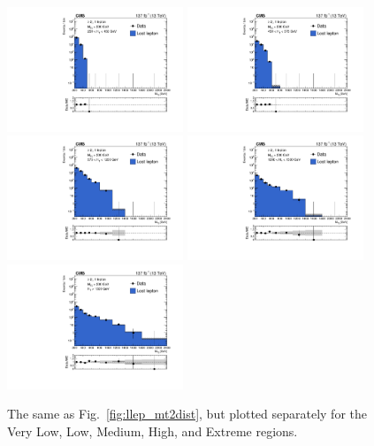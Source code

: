\begin{figure}[t]
  \begin{center}
    \includegraphics[width=0.47\textwidth]{figs/llep/lostlepHybrid_incl_HT250to450_mt2bins.pdf}
    \includegraphics[width=0.47\textwidth]{figs/llep/lostlepHybrid_incl_HT450to575_mt2bins.pdf} \\
    \includegraphics[width=0.47\textwidth]{figs/llep/lostlepHybrid_incl_HT575to1200_mt2bins.pdf}
    \includegraphics[width=0.47\textwidth]{figs/llep/lostlepHybrid_incl_HT1200to1500_mt2bins.pdf} \\
    \includegraphics[width=0.47\textwidth]{figs/llep/lostlepHybrid_incl_HTge1500_mt2bins.pdf}
    \caption{The same as Fig.~\ref{fig:llep_mt2dist}, but plotted separately for the Very Low,
      Low, Medium, High, and Extreme \Ht regions.
            }
    \label{fig:llep_mt2dist_ht}
  \end{center}
\end{figure}

